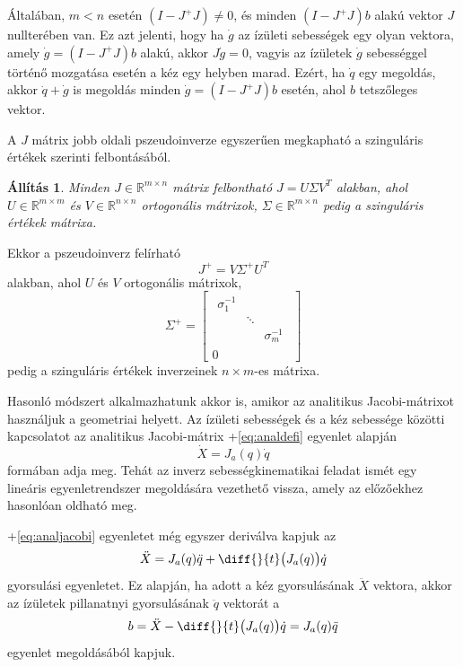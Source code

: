 \documentclass[12pt,a4paper]{report}
\newtheorem{áll}[tét]{Állítás}
\theoremstyle{remark}
\theoremstyle{definition}
\begin{document}
Általában, $m < n$ esetén $(I - J^+ J) \neq 0$, és minden $(I - J^+ J)b$ alakú vektor $J$ nullterében van. Ez azt 
jelenti, hogy ha $\dot{g}$ az ízületi sebességek egy olyan vektora, amely $\dot{g} = (I - J^+ J)b$ alakú, akkor 
$J\dot{g} = 0$, vagyis az ízületek $\dot{g}$ sebességgel történő mozgatása esetén a kéz egy helyben marad. Ezért, ha 
$\dot{q}$ egy megoldás, akkor $\dot{q} + \dot{g}$ is megoldás minden $\dot{g} = (I - J^+ J)b$ esetén, ahol $b$ 
tetszőleges vektor. 

A $J$ mátrix jobb oldali pszeudoinverze egyszerűen megkapható a szinguláris értékek szerinti felbontásából.
\begin{áll}
Minden $J \in \mathbb{R}^{m \times n}$ mátrix felbontható $J = U\Sigma V^T$ alakban, ahol 
$U \in \mathbb{R}^{m \times m}$ és $V \in \mathbb{R}^{n \times n}$ ortogonális mátrixok, 
$\Sigma \in \mathbb{R}^{m \times n}$ pedig a szinguláris értékek mátrixa.
\end{áll}
Ekkor a pszeudoinverz felírható
\begin{equation}
J^+ = V\Sigma^+ U^T
\end{equation}
alakban, ahol $U$ és $V$ ortogonális mátrixok,
\begin{equation}
\Sigma^+ = 
    \left[ \begin{array}{c}
    \begin{array}{ccc}
    \sigma^{-1}_{1} &  &  \\ 
     & \ddots &  \\ 
     &  & \sigma^{-1}_{m}
    \end{array}  \\
    \hline 
    0
    \end{array} \right]
\end{equation}
pedig a szinguláris értékek inverzeinek $n \times m$-es mátrixa.

Hasonló módszert alkalmazhatunk akkor is, amikor az analitikus Jacobi-mátrixot használjuk a geometriai helyett. 
Az ízületi sebességek és a kéz sebessége közötti kapcsolatot az analitikus Jacobi-mátrix \az+\eqref{eq:analdefi} 
egyenlet alapján
\begin{equation} \label{eq:analjacobi}
\dot{X} = J_a(q)\dot{q}
\end{equation}
formában adja meg. Tehát az inverz sebességkinematikai feladat ismét egy lineáris egyenletrendszer megoldására 
vezethető vissza, amely az előzőekhez hasonlóan oldható meg.

\Az+\eqref{eq:analjacobi} egyenletet még egyszer deriválva kapjuk az
\begin{equation}
\ddot{X} = J_a(q)\ddot{q} + \diff{}{t} \big( J_a(q) \big) \dot{q}
\end{equation}
gyorsulási egyenletet. Ez alapján, ha adott a kéz gyorsulásának $\ddot{X}$ vektora, akkor az ízületek pillanatnyi 
gyorsulásának $\ddot{q}$ vektorát a
\begin{equation}
b = \ddot{X} - \diff{}{t} \big( J_a(q) \big) \dot{q} = J_a(q)\ddot{q}
\end{equation}
egyenlet megoldásából kapjuk.
\end{document}
